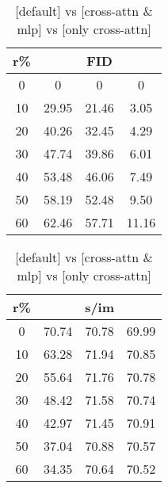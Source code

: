 \begin{table}[htp]
\caption{[default] vs [cross-attn \& mlp] vs [only cross-attn]}
\label{table:exp_1_3}
    \begin{minipage}{0.48\textwidth}
        \centering
        \begin{tabular}{|c||c|c|c|}
            \hline
            \multicolumn{1}{|c||}{r\%} & \multicolumn{3}{c|}{FID}\\
            \hline
            0 & 0 & 0 & 0 \\
            10 & 29.95 & 21.46 & 3.05 \\
            20 & 40.26 & 32.45 & 4.29 \\
            30 & 47.74 & 39.86 & 6.01 \\
            40 & 53.48 & 46.06 & 7.49 \\
            50 & 58.19 & 52.48 & 9.50 \\
            60 & 62.46 & 57.71 & 11.16 \\
            \hline
        \end{tabular}
    \end{minipage}
    \hfill
    \begin{minipage}{0.48\textwidth}
        \centering
        \begin{tabular}{|c||c|c|c|}
            \hline
            \multicolumn{1}{|c||}{r\%} & \multicolumn{3}{c|}{s/im}\\
            \hline
            0 & 70.74 & 70.78 & 69.99 \\
            10 & 63.28 & 71.94 & 70.85 \\
            20 & 55.64 & 71.76 & 70.78 \\
            30 & 48.42 & 71.58 & 70.74 \\
            40 & 42.97 & 71.45 & 70.91 \\
            50 & 37.04 & 70.88 & 70.57 \\
            60 & 34.35 & 70.64 & 70.52 \\
            \hline
        \end{tabular}
    \end{minipage}
\end{table}
